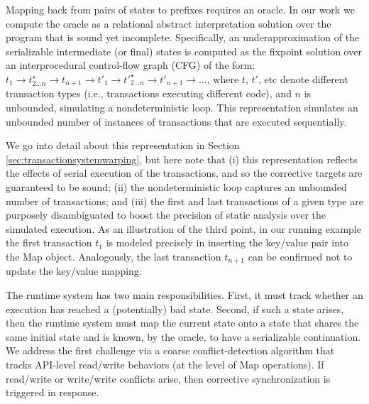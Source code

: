 Mapping back from pairs of states to prefixes requires an oracle. In our work we compute the oracle as a relational abstract interpretation solution over the program that is sound yet incomplete. Specifically, an underapproximation of the serializable intermediate (or final) states is computed as the fixpoint solution over an interprocedural control-flow graph (CFG) of the form: 
	$t_1 \rightarrow t^\star_{2 \ldots n} \rightarrow t_{n+1} \rightarrow t'_1 \rightarrow t'^\star_{2 \ldots n} \rightarrow t'_{n+1} \rightarrow \ldots$,
where $t$, $t'$, etc denote different transaction types (i.e., transactions executing different code), and $n$ is unbounded, simulating a nondeterministic loop. This representation simulates an unbounded number of instances of transactions that are executed sequentially.

We go into detail about this representation in Section \ref{sec:transactionsystemwarping}, but here note that (i) this representation reflects the effects of serial execution of the transactions, and so the corrective targets are guaranteed to be sound; (ii) the nondeterministic loop captures an unbounded number of transactions; and (iii) the first and last transactions of a given type are purposely disambiguated to boost the precision of static analysis over the simulated execution.
%
As an illustration of the third point, in our running example the first transaction $t_1$ is modeled precisely in inserting the key/value pair into the {\sf Map} object. Analogously, the last transaction $t_{n+1}$ can be confirmed not to update the key/value mapping.

%
The runtime system has two main responsibilities. First, it must track whether an execution has reached a (potentially) bad state. Second, if such a state arises, then the runtime system must map the current state onto a state that shares the same initial state and is known, by the oracle, to have a serializable continuation. 
%
We address the first challenge via a coarse conflict-detection algorithm that tracks API-level read/write behaviors (at the level of {\sf Map} operations). If read/write or write/write conflicts arise, then corrective synchronization is triggered in response. 
%


